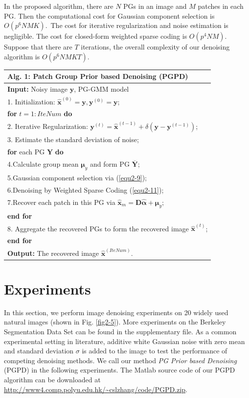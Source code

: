 In the proposed algorithm, there are $N$ PGs in an image and $M$ patches in each PG. Then the computational cost for Gaussian component selection is $O(p^{6}NMK)$.\ The cost for iterative regularization and noise estimation is negligible. The cost for closed-form weighted sparse coding is $O(p^{4}NM)$. Suppose that there are $T$ iterations, the overall complexity of our denoising algorithm is $O(p^{6}NMKT)$.
\begin{table}[t!]
\label{alg1}
\begin{tabular}{l}
\hline
\textbf{Alg. 1}: Patch Group Prior based Denoising (PGPD)
\\
\hline
\textbf{Input:} Noisy image $\bm{y}$, PG-GMM model
\\
1. Initialization: $\hat{\bm{x}}^{(0)}=\bm{y},\bm{y}^{(0)}=\bm{y}$;
\\
\textbf{for} $t = 1:IteNum$ \textbf{do}
\\
2. Iterative Regularization:
$\bm{y}^{(t)}=\hat{\bm{x}}^{(t-1)}+\delta(\bm{y}-\bm{y}^{(t-1)})$;
\\
3. Estimate the standard deviation of noise;
\\
\quad\textbf{for} each PG $\bm{Y}$ \textbf{do}
\\
4.\quad Calculate group mean $\bm{\mu}_{y}$ and form PG $\bm{\overline{Y}}$;
\\
5.\quad Gaussian component selection via (\ref{equ2-9});
\\
6.\quad Denoising by Weighted Sparse Coding (\ref{equ2-11});
\\
7.\quad Recover each patch in this PG via $\hat{\bm{x}}_{m}=\bm{D}\hat{\bm{\alpha}}+\bm{\mu}_{y}$;
\\
\quad\textbf{end for}
\\
8. Aggregate the recovered PGs to form the recovered image $\hat{\bm{x}}^{(t)}$;
\\
\textbf{end for}
\\
\textbf{Output:} The recovered image $\hat{\bm{x}}^{(IteNum)}$.\\
\hline
\end{tabular}
\vspace{-5mm}
\end{table}
\section{Experiments}
In this section, we perform image denoising experiments on 20 widely used natural images (shown in Fig. \ref{fig2-5}). More experiments on the Berkeley Segmentation Data Set \cite{bsds} can be found in the supplementary file. As a common experimental setting in literature, additive white Gaussian noise with zero mean and standard deviation $\sigma$ is added to the image to test the performance of competing denoising methods. We call our method \textsl{PG Prior based Denoising} (PGPD) in the following experiments. The Matlab source code of our PGPD algorithm can be downloaded at \url{http://www4.comp.polyu.edu.hk/~cslzhang/code/PGPD.zip}.

